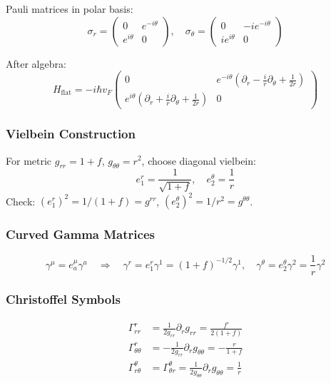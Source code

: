 \documentclass[12pt]{article}
\begin{document}
Pauli matrices in polar basis:
\begin{equation}
    \sigma_r = \begin{pmatrix} 0 & e^{-i\theta} \\ e^{i\theta} & 0 \end{pmatrix}, \quad
    \sigma_\theta = \begin{pmatrix} 0 & -ie^{-i\theta} \\ ie^{i\theta} & 0 \end{pmatrix}
\end{equation}

After algebra:
\begin{equation}
    H_{\text{flat}} = -i\hbar v_F \begin{pmatrix}
    0 & e^{-i\theta}\left(\partial_r - \frac{i}{r}\partial_\theta + \frac{1}{2r}\right) \\
    e^{i\theta}\left(\partial_r + \frac{i}{r}\partial_\theta + \frac{1}{2r}\right) & 0
    \end{pmatrix}
    \tag{Eq. 10}
\end{equation}

\subsubsection{Vielbein Construction}

For metric $g_{rr} = 1+f$, $g_{\theta\theta} = r^2$, choose diagonal vielbein:
\begin{equation}
    e_1^r = \frac{1}{\sqrt{1+f}}, \quad e_2^\theta = \frac{1}{r}
\end{equation}
Check: $(e_1^r)^2 = 1/(1+f) = g^{rr}$, $(e_2^\theta)^2 = 1/r^2 = g^{\theta\theta}$.

\subsubsection{Curved Gamma Matrices}
\begin{equation}
    \gamma^\mu = e_a^\mu \gamma^a \quad \Rightarrow \quad
    \gamma^r = e_1^r \gamma^1 = (1+f)^{-1/2} \gamma^1, \quad
    \gamma^\theta = e_2^\theta \gamma^2 = \frac{1}{r} \gamma^2
\end{equation}

\subsubsection{Christoffel Symbols}
\begin{align}
    \Gamma^r_{rr} &= \frac{1}{2g_{rr}} \partial_r g_{rr} = \frac{f'}{2(1+f)} \\
    \Gamma^r_{\theta\theta} &= -\frac{1}{2g_{rr}} \partial_r g_{\theta\theta} = -\frac{r}{1+f} \\
    \Gamma^\theta_{r\theta} &= \Gamma^\theta_{\theta r} = \frac{1}{2g_{\theta\theta}} \partial_r g_{\theta\theta} = \frac{1}{r}
\end{align}
\end{document}
